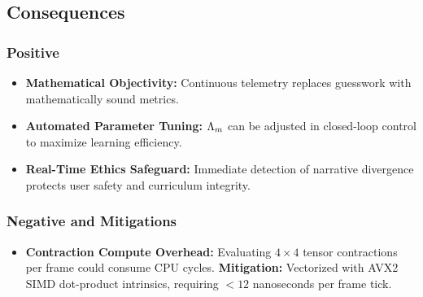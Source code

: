 \subsection{Consequences}
\subsubsection{Positive}
\begin{itemize}
    \item \textbf{Mathematical Objectivity:} Continuous telemetry replaces guesswork with mathematically sound metrics.
    \item \textbf{Automated Parameter Tuning:} $\Lambda_m$ can be adjusted in closed-loop control to maximize learning efficiency.
    \item \textbf{Real-Time Ethics Safeguard:} Immediate detection of narrative divergence protects user safety and curriculum integrity.
\end{itemize}

\subsubsection{Negative and Mitigations}
\begin{itemize}
    \item \textbf{Contraction Compute Overhead:} Evaluating $4 \times 4$ tensor contractions per frame could consume CPU cycles. \textbf{Mitigation:} Vectorized with AVX2 SIMD dot-product intrinsics, requiring $< 12$ nanoseconds per frame tick.
\end{itemize}
